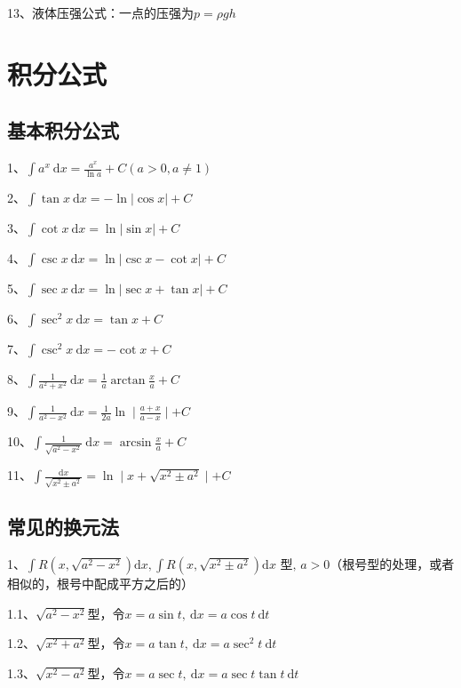13、液体压强公式：一点的压强为$p=\rho gh$

\section{积分公式}



\subsection{基本积分公式}

1、$\int a^{x} \mathrm{~d} x=\frac{a^{x}}{\ln a}+C(a>0, a \neq 1)$

2、$\int \tan x \mathrm{~d} x=-\ln |\cos x|+C$

3、$\int \cot x \mathrm{~d} x=\ln |\sin x|+C$

4、$\int \csc x \mathrm{~d} x=\ln |\csc x-\cot x|+C$

5、$\int \sec x \mathrm{~d} x=\ln |\sec x+\tan x|+C$

6、$\int \sec ^{2} x \mathrm{~d} x=\tan x+C$

7、$\int \csc ^{2} x \mathrm{~d} x=-\cot x+C$

8、$\int \frac{1}{a^{2}+x^{2}} \mathrm{~d} x=\frac{1}{a} \arctan \frac{x}{a}+C$

9、$\int \frac{1}{a^{2}-x^{2}} \mathrm{~d} x=\frac{1}{2 a} \ln \mid \frac{a+x}{a-x} \mid+C$

10、$\int \frac{1}{\sqrt{a^{2}-x^{2}}} \mathrm{~d} x=\arcsin \frac{x}{a}+C$

11、$\int \frac{\mathrm{d} x}{\sqrt{x^{2} \pm a^{2}}}=\ln \mid x+\sqrt{x^{2} \pm a^{2}} \mid+ C$



\subsection{常见的换元法}

1、$\int R\left(x, \sqrt{a^{2}-x^{2}}\right) \mathrm{d} x, \int R\left(x, \sqrt{x^{2} \pm a^{2}}\right) \mathrm{d} x \text { 型, } a>0$（根号型的处理，或者相似的，根号中配成平方之后的）

1.1、$\sqrt{a^{2}-x^{2}}$型，令$x=a \sin t, \mathrm{~d} x=a \cos t \mathrm{~d} t$

1.2、$\sqrt{x^{2}+a^{2}}$型，令$x=a \tan t, \mathrm{~d} x=a \sec ^{2} t \mathrm{~d} t$

1.3、$\sqrt{x^{2}-a^{2}}$型，令$x=a \sec t, \mathrm{~d} x=a \sec t \tan t \mathrm{~d} t$

